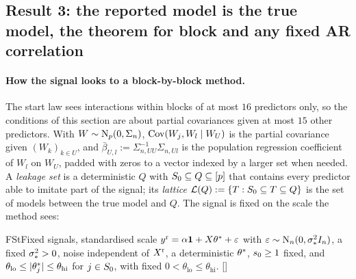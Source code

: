 \subsection{Result 3: the reported model is the true model, the theorem for block and any fixed AR correlation}\label{sec:reported}



\paragraph{How the signal looks to a block-by-block method.} The start law sees interactions within blocks of at most
$16$ predictors only, so the conditions of this section are about partial covariances given at most $15$ other
predictors. With $W\sim\mathrm{N}_p(0,\Sigma_n)$, $\operatorname{Cov}(W_j,W_l\mid W_U)$ is the partial covariance given $(W_k)_{k\in U}$, and
$\bar\beta_{U,l}:=\Sigma_{n,UU}^{-1}\Sigma_{n,Ul}$ is the population regression coefficient of $W_l$ on $W_U$, padded
with zeros to a vector indexed by a larger set when needed. A
\emph{leakage set} is a deterministic $Q$ with $S_0\subseteq Q\subseteq[p]$ that contains every predictor able to
imitate part of the signal; its \emph{lattice} $\mathcal L(Q):=\{T:S_0\subseteq T\subseteq Q\}$ is the set of models between the
true model and $Q$. The signal is fixed on the scale the method sees:

\begin{assumption}{FSt}{Fixed signals, standardised scale}
$y^{\mathrm r}=\alpha\mathbf{1}+X\theta^*+\varepsilon$ with $\varepsilon\sim\mathrm{N}_n(0,\sigma_*^2I_n)$, a fixed $\sigma_*^2>0$, noise independent
of $X^{\mathrm r}$, a deterministic $\theta^*$, $s_0\ge1$ fixed, and $\theta_{\mathrm{lo}}\le\lvert \theta^*_j\rvert\le\theta_{\mathrm{hi}}$ for
$j\in S_0$, with fixed $0<\theta_{\mathrm{lo}}\le\theta_{\mathrm{hi}}$. \hfill []
\end{assumption}

